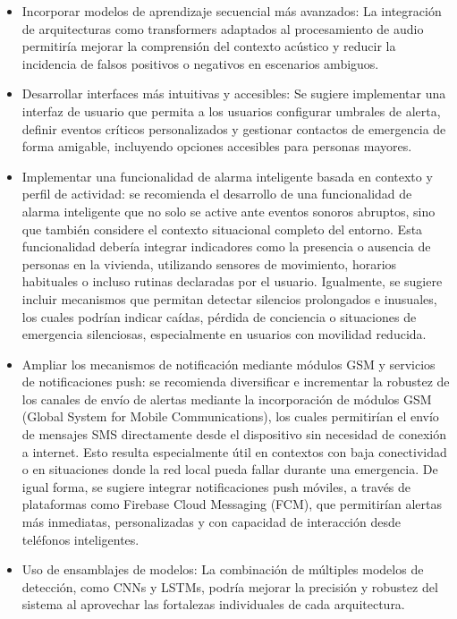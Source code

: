 
\begin{itemize}
  \item Incorporar modelos de aprendizaje secuencial más avanzados: La integración de arquitecturas como transformers adaptados al procesamiento de audio permitiría mejorar la comprensión del contexto acústico y reducir la incidencia de falsos positivos o negativos en escenarios ambiguos.
  \item Desarrollar interfaces más intuitivas y accesibles: Se sugiere implementar una interfaz de usuario que permita a los usuarios configurar umbrales de alerta, definir eventos críticos personalizados y gestionar contactos de emergencia de forma amigable, incluyendo opciones accesibles para personas mayores.
  \item Implementar una funcionalidad de alarma inteligente basada en contexto y perfil de actividad: se recomienda el desarrollo de una funcionalidad de alarma inteligente que no solo se active ante eventos sonoros abruptos, sino que también considere el contexto situacional completo del entorno. Esta funcionalidad debería integrar indicadores como la presencia o ausencia de personas en la vivienda, utilizando sensores de movimiento, horarios habituales o incluso rutinas declaradas por el usuario. Igualmente, se sugiere incluir mecanismos que permitan detectar silencios prolongados e inusuales, los cuales podrían indicar caídas, pérdida de conciencia o situaciones de emergencia silenciosas, especialmente en usuarios con movilidad reducida.
  \item Ampliar los mecanismos de notificación mediante módulos GSM y servicios de notificaciones push: se recomienda diversificar e incrementar la robustez de los canales de envío de alertas mediante la incorporación de módulos GSM (Global System for Mobile Communications), los cuales permitirían el envío de mensajes SMS directamente desde el dispositivo sin necesidad de conexión a internet. Esto resulta especialmente útil en contextos con baja conectividad o en situaciones donde la red local pueda fallar durante una emergencia. De igual forma, se sugiere integrar notificaciones push móviles, a través de plataformas como Firebase Cloud Messaging (FCM), que permitirían alertas más inmediatas, personalizadas y con capacidad de interacción desde teléfonos inteligentes.
  \item Uso de ensamblajes de modelos: La combinación de múltiples modelos de detección, como CNNs y LSTMs, podría mejorar la precisión y robustez del sistema al aprovechar las fortalezas individuales de cada arquitectura.

\end{itemize}
